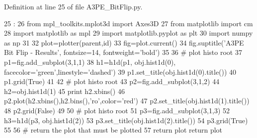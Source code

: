 Definition at line 25 of file A3PE\_\-BitFlip.py.


\begin{DoxyCode}
25                               :
26     from mpl_toolkits.mplot3d import Axes3D
27     from matplotlib import cm
28     import matplotlib as mpl
29     import matplotlib.pyplot as plt
30     import numpy as np
31 
32     plot=plotter(parent,id)
33     fig=plot.current()
34     fig.suptitle('A3PE Bit Flip - Results', fontsize=14, fontweight='bold')
35 
36     # plot histo root
37     p1=fig.add_subplot(3,1,1)
38     h1=h1d(p1, obj.hist1d(0), facecolor='green',linestyle='dashed')
39     p1.set_title(obj.hist1d(0).title())
40     p1.grid(True)
41 
42     # plot histo root
43     p2=fig.add_subplot(3,1,2)
44     h2=obj.hist1d(1)
45     print h2.xbins()
46     p2.plot(h2.xbins(),h2.bins(),'ro',color='red')
47     p2.set_title(obj.hist1d(1).title())
48     p2.grid(False)
49 
50     # plot histo root
51     p3=fig.add_subplot(3,1,3)
52     h3=h1d(p3, obj.hist1d(2))
53     p3.set_title(obj.hist1d(2).title())
54     p3.grid(True)
55 
56     # return the plot that must be plotted
57     return plot
    return plot
\end{DoxyCode}
